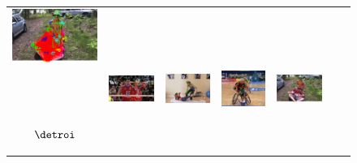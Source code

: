 \begin{figure}
\begin{tabular}{c c c c c c c}
    \includegraphics[height=0.140\linewidth]{imgidx_0903_graph_mpii_multi.pdf}\\
    &
    \includegraphics[height=0.140\linewidth]{imgidx_0092_sticks_mpii_multi.pdf}&
    \includegraphics[height=0.140\linewidth]{imgidx_1366_sticks_mpii_multi.pdf}& 
    \includegraphics[height=0.140\linewidth]{imgidx_0094_sticks_mpii_multi.pdf}&
    \includegraphics[height=0.140\linewidth]{imgidx_0903_sticks_mpii_multi.pdf}\\
    \midrule\midrule
    \begin{sideways}\bf \quad\quad$\detroi$\end{sideways}&


\end{tabular}
\end{figure}
